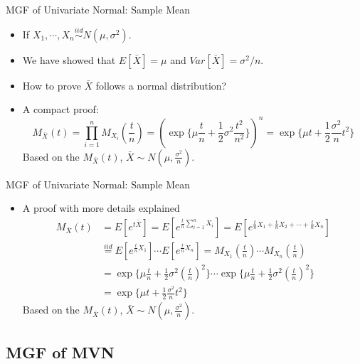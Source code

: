 \documentclass[
  ignorenonframetext,
]{beamer}
\providecommand{\tightlist}{%
  \setlength{\itemsep}{0pt}\setlength{\parskip}{0pt}}
\begin{document}
\begin{frame}{MGF of Univariate Normal: Sample Mean}
\protect\hypertarget{mgf-of-univariate-normal-sample-mean}{}
\begin{itemize}
\tightlist
\item
  If \(X_1, \cdots, X_n \overset{iid}\sim N(\mu, \sigma^2)\).
\item
  We have showed that \(E[\bar X]=\mu\) and \(Var[\bar X]=\sigma^2/n\).
\item
  How to prove \(\bar X\) follows a normal distribution?
\item
  A compact proof: \[
  M_{\bar{X}}(t) = \prod_{i=1}^{n} M_{X_i}(\frac{t}{n})= \left(\exp\{\mu\frac{t}{n} + \frac{1}{2}\sigma^2 \frac{t^2}{n^2}\}\right)^n
  =\exp\{\mu t + \frac{1}{2}\frac{\sigma^2}{n}t^2 \}
  \] Based on the \(M_{\bar X}(t)\),
  \(\bar X\sim N(\mu, \frac{\sigma^2}{n})\).
\end{itemize}
\end{frame}

\begin{frame}{MGF of Univariate Normal: Sample Mean}
\protect\hypertarget{mgf-of-univariate-normal-sample-mean-1}{}
\begin{itemize}
\tightlist
\item
  A proof with more details explained \[
  \begin{aligned}
  M_{\bar X}(t)&=E[e^{t\bar X}]= E[e^{\frac{t}{n} \sum_{i=1}^n X_i}]=E[e^{\frac{t}{n} X_1 + \frac{t}{n} X_2 + \cdots + \frac{t}{n} X_n}]\\
  &\overset{iid}=E[e^{\frac{t}{n} X_1}]\cdots E[e^{\frac{t}{n} X_n}]=M_{X_1}(\frac{t}{n}) \cdots M_{X_n}(\frac{t}{n})\\
  &= \exp\{\mu\frac{t}{n}+\frac{1}{2}\sigma^2 (\frac{t}{n})^2\}\cdots \exp\{\mu\frac{t}{n}+\frac{1}{2}\sigma^2 (\frac{t}{n})^2\}\\
  &= \exp\{\mu t + \frac{1}{2}\frac{\sigma^2}{n}t^2\}
  \end{aligned}
  \] Based on the \(M_{\bar X}(t)\),
  \(\bar X\sim N(\mu, \frac{\sigma^2}{n})\).
\end{itemize}
\end{frame}

\hypertarget{mgf-of-mvn}{%
\subsection{MGF of MVN}\label{mgf-of-mvn}}
\end{document}
